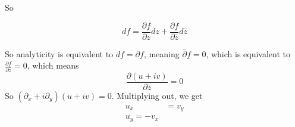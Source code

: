 \documentclass[x11names,reqno,14pt]{extarticle}
\begin{document}
So 

\[
df = \frac{\partial f}{\partial z}dz + \frac{\partial f}{\partial \bar{z}}d\bar{z}
\]

So analyticity is equivalent to $df = \partial f$, meaning $\bar{\partial}f = 0$, which is equivalent to $\frac{\partial f}{\partial \bar{z}} = 0$, which means
\[
\frac{\partial (u + iv)}{\partial\bar{z}} = 0
\]
So $(\partial_x + i\partial_y)(u + iv) = 0$. Multiplying out, we get
\begin{align*}
u_x & = v_y \\
u_y = - v_x \\
\end{align*}
\end{document}
